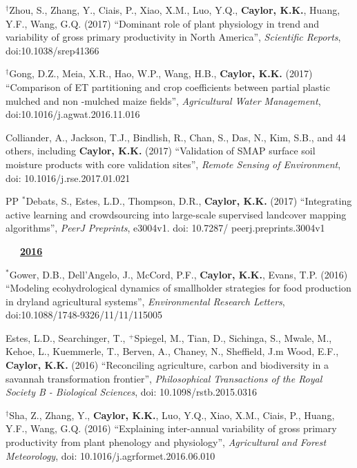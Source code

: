 \documentclass[10pt]{report}
\begin{document}
\begin{etaremune}
\item $^{\dagger}$Zhou, S., Zhang, Y., Ciais, P., Xiao, X.M., Luo, Y.Q., \textbf{Caylor, K.K.}, Huang, Y.F., Wang, G.Q. (2017) ``Dominant role of plant physiology in trend and variability of gross primary productivity in North America'', {\em Scientific Reports}, doi:10.1038/srep41366

\item $^{\dagger}$Gong, D.Z., Meia, X.R., Hao, W.P., Wang, H.B., \textbf{Caylor, K.K.} (2017) ``Comparison of ET partitioning and crop coefficients between partial plastic mulched and non -mulched maize fields'', {\em Agricultural Water Management}, doi:10.1016/j.agwat.2016.11.016

\item Colliander, A., Jackson, T.J., Bindlish, R., Chan, S., Das, N., Kim, S.B., and  44 others, including \textbf{Caylor, K.K.} (2017) ``Validation of SMAP surface soil moisture products with core validation sites'', {\em Remote Sensing of Environment}, doi: 10.1016/j.rse.2017.01.021

\item [PP] $^{*}$Debats, S., Estes, L.D., Thompson, D.R., \textbf{Caylor, K.K.} (2017) ``Integrating active learning and crowdsourcing into large-scale supervised landcover mapping algorithms'', {\em PeerJ Preprints}, e3004v1. doi: 10.7287/ peerj.preprints.3004v1


\mbox{\ \ \ \underline{\textbf{2016}}}

\item $^{*}$Gower, D.B., Dell'Angelo, J., McCord, P.F.,  \textbf{Caylor, K.K.}, Evans, T.P. (2016) ``Modeling ecohydrological dynamics of smallholder strategies for food production in dryland agricultural systems'', {\em Environmental Research Letters}, doi:10.1088/1748-9326/11/11/115005

\item Estes, L.D., Searchinger, T., $^{+}$Spiegel, M., Tian, D., Sichinga, S., Mwale, M., Kehoe, L., Kuemmerle, T., Berven, A., Chaney, N., Sheffield, J.m Wood, E.F., \textbf{Caylor, K.K.} (2016) ``Reconciling agriculture, carbon and biodiversity in a savannah transformation frontier'', {\em Philosophical Transactions of the Royal Society B - Biological Sciences}, doi: 10.1098/rstb.2015.0316

\item $^{\dagger}$Sha, Z., Zhang, Y., \textbf{Caylor, K.K.}, Luo, Y.Q., Xiao, X.M., Ciais, P., Huang, Y.F., Wang, G.Q. (2016) ``Explaining inter-annual variability of gross primary productivity from plant phenology and physiology'', {\em Agricultural and Forest Meteorology}, doi: 10.1016/j.agrformet.2016.06.010


\end{etaremune}
\end{document}
